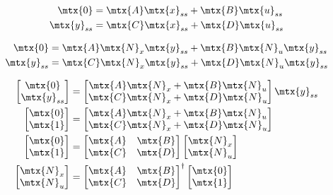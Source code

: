 \begin{align*}
  \mtx{0} &= \mtx{A}\mtx{x}_{ss} + \mtx{B}\mtx{u}_{ss} \\
  \mtx{y}_{ss} &= \mtx{C}\mtx{x}_{ss} + \mtx{D}\mtx{u}_{ss}
\end{align*}

\begin{align*}
  \mtx{0} &= \mtx{A}\mtx{N}_x\mtx{y}_{ss} + \mtx{B}\mtx{N}_u\mtx{y}_{ss} \\
  \mtx{y}_{ss} &= \mtx{C}\mtx{N}_x\mtx{y}_{ss} + \mtx{D}\mtx{N}_u\mtx{y}_{ss}
\end{align*}

\begin{align*}
  \begin{bmatrix}
    \mtx{0} \\
    \mtx{y}_{ss}
  \end{bmatrix} &=
  \begin{bmatrix}
    \mtx{A}\mtx{N}_x + \mtx{B}\mtx{N}_u \\
    \mtx{C}\mtx{N}_x + \mtx{D}\mtx{N}_u
  \end{bmatrix}
  \mtx{y}_{ss} \\
  \begin{bmatrix}
    \mtx{0} \\
    \mtx{1}
  \end{bmatrix} &=
  \begin{bmatrix}
    \mtx{A}\mtx{N}_x + \mtx{B}\mtx{N}_u \\
    \mtx{C}\mtx{N}_x + \mtx{D}\mtx{N}_u
  \end{bmatrix} \\
  \begin{bmatrix}
    \mtx{0} \\
    \mtx{1}
  \end{bmatrix} &=
  \begin{bmatrix}
    \mtx{A} & \mtx{B} \\
    \mtx{C} & \mtx{D}
  \end{bmatrix}
  \begin{bmatrix}
    \mtx{N}_x \\
    \mtx{N}_u
  \end{bmatrix} \\
  \begin{bmatrix}
    \mtx{N}_x \\
    \mtx{N}_u
  \end{bmatrix} &=
  \begin{bmatrix}
    \mtx{A} & \mtx{B} \\
    \mtx{C} & \mtx{D}
  \end{bmatrix}^{\dagger}
  \begin{bmatrix}
    \mtx{0} \\
    \mtx{1}
  \end{bmatrix}
\end{align*}


